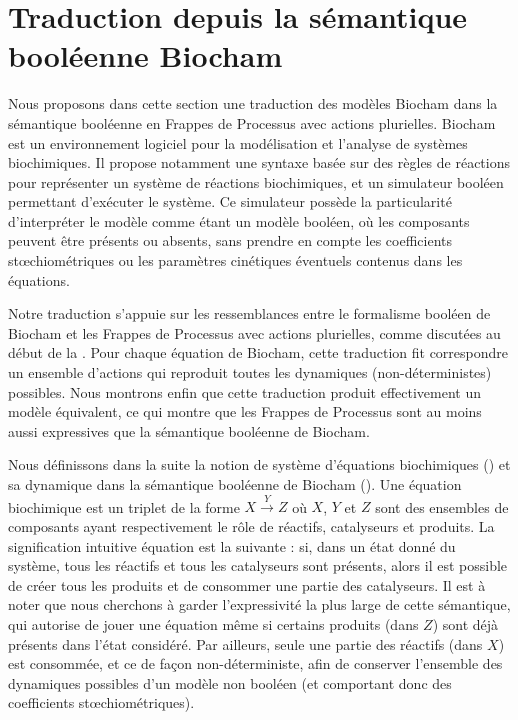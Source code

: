 
\section{Traduction depuis la sémantique booléenne Biocham}

Nous proposons dans cette section une traduction des modèles Biocham dans la sémantique booléenne
en Frappes de Processus avec actions plurielles.
Biocham 
est un environnement logiciel pour la modélisation et l'analyse de systèmes biochimiques.
Il propose notamment une syntaxe basée sur des règles de réactions pour représenter
un système de réactions biochimiques,
et un simulateur booléen permettant d'exécuter le système.
Ce simulateur possède la particularité d'interpréter le modèle comme étant un modèle booléen,
où les composants peuvent être présents ou absents,
sans prendre en compte les coefficients stœchiométriques ou les paramètres cinétiques
éventuels contenus dans les équations.

Notre traduction s'appuie sur les ressemblances entre le formalisme booléen de Biocham
et les Frappes de Processus avec actions plurielles, comme discutées au début de la
.
Pour chaque équation de Biocham, cette traduction fit correspondre
un ensemble d'actions qui reproduit toutes les dynamiques (non-déterministes) possibles.
Nous montrons enfin que cette traduction produit effectivement un modèle équivalent,
ce qui montre que les Frappes de Processus sont au moins aussi expressives
que la sémantique booléenne de Biocham.

\myskip

Nous définissons dans la suite la notion de système d'équations biochimiques ()
et sa dynamique dans la sémantique booléenne de Biocham ().
Une équation biochimique est un triplet de la forme $X \xrightarrow{Y} Z$
où $X$, $Y$ et $Z$ sont des ensembles de composants ayant respectivement le rôle
de réactifs, catalyseurs et produits.
La signification intuitive équation est la suivante :
si, dans un état donné du système, tous les réactifs et tous les catalyseurs sont présents,
alors il est possible de créer tous les produits et de consommer une partie des catalyseurs.
Il est à noter que nous cherchons à garder l'expressivité la plus large de cette sémantique,
qui autorise de jouer une équation même si certains produits (dans $Z$) sont déjà présents
dans l'état considéré.
Par ailleurs, seule une partie des réactifs (dans $X$) est consommée, et ce de façon
non-déterministe, afin de conserver l'ensemble des dynamiques possibles d'un modèle non booléen
(et comportant donc des coefficients stœchiométriques).

